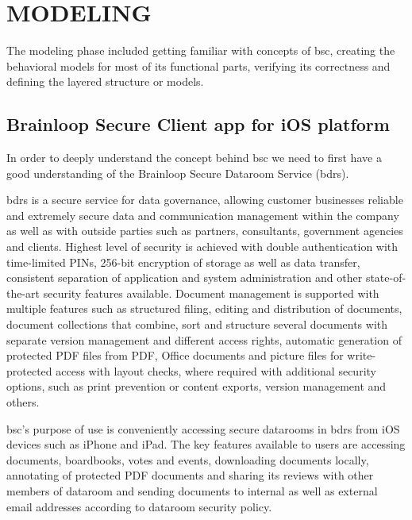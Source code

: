 \chapter{MODELING}
\label{chapter:modeling}

\par
The modeling phase included getting familiar with concepts of \acrshort{bsc}, creating the behavioral models for most of its functional parts, verifying its correctness and  defining the layered structure or models.

\section{Brainloop Secure Client app for iOS platform} 

\par
In order to deeply understand the concept behind \acrshort{bsc} we need to first have a good understanding of the Brainloop Secure Dataroom Service (\acrshort{bdrs}). 

\par
\acrshort{bdrs} \cite{BDRS_Description} is a secure service for data governance, allowing customer businesses reliable and extremely secure data and communication management within the company as well as with outside parties such as partners, consultants, government agencies and clients. Highest level of security is achieved with double authentication with time-limited PINs, 256-bit encryption of storage as well as data transfer, consistent separation of application and system administration and other state-of-the-art security features available. Document management is supported with multiple features such as structured filing, editing and distribution of documents, document collections that combine, sort and structure several documents with separate version management and different access rights, automatic generation of protected PDF files from PDF, Office documents and picture files for write-protected access with layout checks, where required with additional security options, such as print prevention or content exports, version management and others.

\par
\acrshort{bsc}'s \cite{BSC_UserGuide} purpose of use is conveniently accessing secure datarooms in \acrshort{bdrs} from iOS devices such as iPhone and iPad. The key features available to users are accessing documents, boardbooks, votes and events, downloading documents locally, annotating of protected PDF documents and sharing its reviews with other members of dataroom and sending documents to internal as well as external email addresses according to dataroom security policy.

